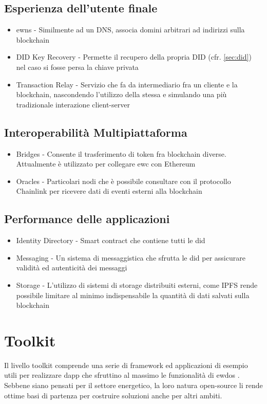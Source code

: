 \subsection{Esperienza dell'utente finale}
\begin{itemize}
    \item \gls{ewns} - Similmente ad un DNS, associa domini arbitrari ad indirizzi sulla blockchain
    \item DID Key Recovery - Permette il recupero della propria DID  (cfr. \autoref{sec:did})
    nel caso si fosse persa la chiave privata
    \item Transaction Relay - Servizio che fa da intermediario fra un cliente e la blockchain, nascondendo l'utilizzo della stessa e simulando una più tradizionale interazione client-server
\end{itemize}

\subsection{Interoperabilità Multipiattaforma}
\begin{itemize}
    \item Bridges - Consente il trasferimento di token fra blockchain diverse. Attualmente è utilizzato per collegare \gls{ewc} con Ethereum
    \item Oracles - Particolari nodi che è possibile consultare con il protocollo Chainlink per ricevere dati di eventi esterni alla blockchain \cite{art:oracles} \cite{wiki:oracles} 
\end{itemize}

\subsection{Performance delle applicazioni}
\begin{itemize}
    \item Identity Directory - Smart contract che contiene tutti le \gls{did}
    \item Messaging - Un sistema di messaggistica che sfrutta le \gls{did} per assicurare validità ed autenticità dei messaggi
    \item Storage - L'utilizzo di sistemi di storage distribuiti esterni, come IPFS \cite{wiki:ipfs}  rende possibile limitare al minimo indispensabile la quantità di dati salvati sulla blockchain
\end{itemize}

\section{Toolkit}
Il livello toolkit comprende una serie di framework ed applicazioni di esempio utili per realizzare \gls{dapp} che sfruttino al massimo le funzionalità di \gls{ewdos} \cite{art:ew-dos}.
Sebbene siano pensati per il settore energetico, la loro natura open-source li rende ottime basi di partenza per costruire soluzioni anche per altri ambiti.

